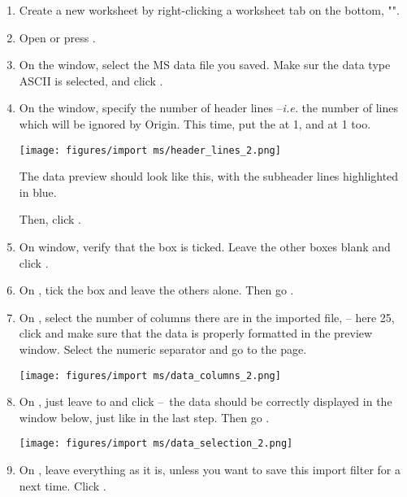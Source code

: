 \documentclass[a4paper, 11pt, raggedright, parskip, sans, colorful]{tufte-style-article}
\begin{document}
\begin{enumerate}

\item Create a new worksheet by right-clicking a worksheet tab on the bottom, "".

\item Open  or press .

\item On the  window, select the MS data file you saved. Make sur the data type ASCII is selected, and click .

\item On the  window, specify the number of header lines --\textit{i.e.} the number of lines which will be ignored by Origin. This time, put the  at 1, and  at 1 too.

\texttt{[image: figures/import ms/header\_lines\_2.png]}

The data preview should look like this, with the subheader lines highlighted in blue.

Then, click .

\item On  window, verify that the  box is ticked. Leave the other boxes blank and click . 

\item On , tick the  box and leave the others alone. Then go .

\item On , select the number of columns there are in the imported file, -- here 25, click  and make sure that the data is properly formatted in the preview window. Select the  numeric separator and go to the  page.

\texttt{[image: figures/import ms/data\_columns\_2.png]}

\item On , just leave  to  and click  --~the data should be correctly displayed in the window below, just like in the last step. Then go .

\texttt{[image: figures/import ms/data\_selection\_2.png]}

\item On , leave everything as it is, unless you want to save this import filter for a next time. Click .

\end{enumerate}
\end{document}

